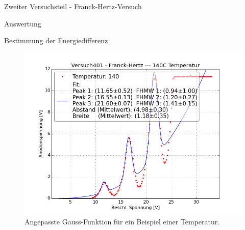 \documentclass[pdftex, a4paper,11pt, twoside, ngerman]{report}
\begin{document}
\begin{chapter}{Zweiter Versuchsteil - Franck-Hertz-Versuch}
\begin{section}{Auswertung}
\begin{subsection}{Bestimmung der Energiedifferenz}
\begin{figure}[ht]
\begin{minipage}{0.48\textwidth}
            \includegraphics[width=\textwidth]
                {Figures/Versuch401-Franck-Hertz-140CTemperatur_Beschl_Spannung_Anodenspannung.png}
            \caption{Angepasste Gauss-Funktion für ein Beispiel einer
                Temperatur.}
            \label{fig:FHT140C}
          \end{minipage}
        \end{figure}
        
      \end{subsection}
      
      
      

\end{section}
\end{chapter}
\end{document}
